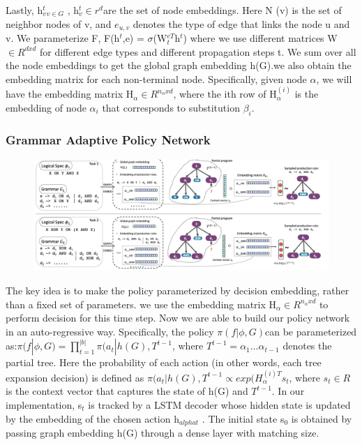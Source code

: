 \documentclass{article}
\begin{document}
Lastly, {h$^t_v$}$_{v\in G}$ , h$^t_v \in r^d$are the set of node embeddings. Here N (v) is the set of neighbor nodes of v, and $e_{u,v}$ denotes the type of edge that links the node u and v. We parameterize F, F(h$^t$,e) = $\sigma$(W$^{eT}_t$h$^t$) where we use different matrices W$\in R^{dxd}$ for different edge types and different propagation steps t. We sum over all the node embeddings to get the global graph embedding h(G).we also obtain the embedding matrix for each non-terminal node. Specifically, given node $\alpha$, we will have the embedding matrix H$_\alpha \in R^{n_\alpha x d}$, where the ith row of H$_\alpha^{(i)}$ is the embedding of node $\alpha_i$ that corresponds to substitution $\beta_i$.
\subsubsection{Grammar Adaptive Policy Network}
\begin{figure}[ht]
\vskip 0.2in
\begin{center}
\centerline{\includegraphics[width=\columnwidth]{Images/Synthesis1-2.png}}
\label{icml-historical}
\end{center}
\vskip -0.2in
\end{figure}

The key idea is to make the policy parameterized by decision embedding, rather than a fixed set of parameters. we use the embedding matrix H$_\alpha \in R^{n_\alpha x d}$ to perform decision for this time step. Now we are able to build our policy network in an auto-regressive way. Specifically, the policy $\pi(f|\phi,G)$can be parameterized as:$\pi(f|\phi,G) = \prod_{t=1}^{|b|} \pi(a_t|h(G),T^{t-1}$, where $T^{t-1}= \alpha_1 ... \alpha_{t-1}$ denotes the partial tree. Here the probability of each action (in other words, each tree expansion decision) is defined as $\pi(a_t|h(G),T^{t-1}\propto exp(H_\alpha^{(i)T}s_t$, where $s_t \in R$ is the context vector that captures the state of h(G) and $T^{t-1}$. In our implementation, s$_t$ is tracked by a LSTM decoder whose hidden state is updated by the embedding of the chosen action h$_{alpha t}$ . The initial state s$_0$ is obtained by passing graph embedding h(G) through a dense layer with matching size.
\end{document}
